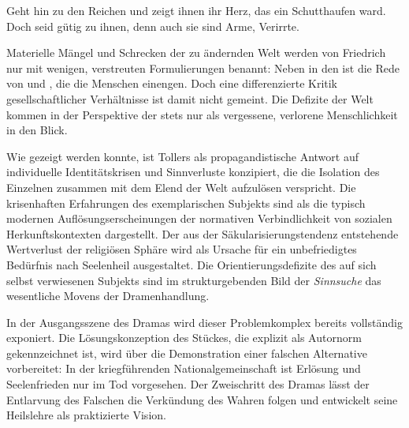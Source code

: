 \begin{BlockQuote}
  Geht hin zu den Reichen und zeigt ihnen ihr Herz, das ein Schutthaufen
  ward. Doch seid gütig zu ihnen, denn auch sie sind Arme, Verirrte. 
\end{BlockQuote}
Materielle Mängel und Schrecken der zu ändernden Welt werden von Friedrich nur
mit wenigen, verstreuten Formulierungen benannt: Neben \Cite{Armut und Elend}
in den \Cite{Abfallgruben verpesteter Städte}  ist die Rede von
\Cite{gewaltigen Maschinen} und \Cite{Eisenhäusern, von Rost zerfressen}
, die
die Menschen einengen. Doch eine differenzierte Kritik gesellschaftlicher
Verhältnisse ist damit nicht gemeint. Die Defizite der Welt kommen in der
Perspektive der  stets nur als vergessene, verlorene
Menschlichkeit in den Blick.


Wie gezeigt werden konnte, ist Tollers  als propagandistische
Antwort auf individuelle Identitätskrisen und Sinnverluste konzipiert, die die
Isolation des Einzelnen zusammen mit dem Elend der Welt aufzulösen verspricht.
Die krisenhaften Erfahrungen des exemplarischen Subjekts sind als die typisch
modernen Auflösungserscheinungen der normativen Verbindlichkeit von sozialen
Herkunftskontexten dargestellt. Der aus der Säkularisierungstendenz
entstehende Wertverlust der religiösen Sphäre wird als Ursache für ein
unbefriedigtes Bedürfnis nach Seelenheil ausgestaltet. Die
Orientierungsdefizite des auf sich selbst verwiesenen Subjekts sind im
strukturgebenden Bild der \emph{Sinnsuche} das wesentliche Movens der
Dramenhandlung.

In der Ausgangsszene des Dramas wird dieser Problemkomplex bereits vollständig
exponiert. Die Lösungskonzeption des Stückes, die explizit als Autornorm
gekennzeichnet ist, wird über die Demonstration einer falschen Alternative
vorbereitet: In der kriegführenden Nationalgemeinschaft ist Erlösung und
Seelenfrieden nur im Tod vorgesehen. Der Zweischritt des Dramas lässt der
Entlarvung des Falschen die Verkündung des Wahren folgen und entwickelt seine
Heilslehre als praktizierte Vision.

